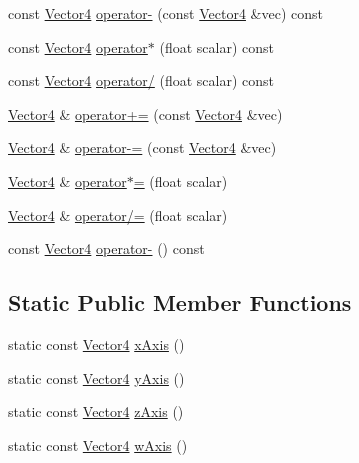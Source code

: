 \begin{DoxyCompactItemize}
\item 
const \hyperlink{classVectormath_1_1Aos_1_1Vector4}{Vector4} \hyperlink{classVectormath_1_1Aos_1_1Vector4_a8018bdd658ac8f5219821ce9fdda49a5}{operator-\/} (const \hyperlink{classVectormath_1_1Aos_1_1Vector4}{Vector4} \&vec) const 
\item 
const \hyperlink{classVectormath_1_1Aos_1_1Vector4}{Vector4} \hyperlink{classVectormath_1_1Aos_1_1Vector4_a1ab5dcfc7471a3a4191ada309e8e6b17}{operator$\ast$} (float scalar) const 
\item 
const \hyperlink{classVectormath_1_1Aos_1_1Vector4}{Vector4} \hyperlink{classVectormath_1_1Aos_1_1Vector4_aa9a6c8290b9d0df86cb084d79bf224bc}{operator/} (float scalar) const 
\item 
\hyperlink{classVectormath_1_1Aos_1_1Vector4}{Vector4} \& \hyperlink{classVectormath_1_1Aos_1_1Vector4_a05e9de303e992db07da0a063c082b6ad}{operator+=} (const \hyperlink{classVectormath_1_1Aos_1_1Vector4}{Vector4} \&vec)
\item 
\hyperlink{classVectormath_1_1Aos_1_1Vector4}{Vector4} \& \hyperlink{classVectormath_1_1Aos_1_1Vector4_a59bf2cc9b51c71553a6c7215f26b1975}{operator-\/=} (const \hyperlink{classVectormath_1_1Aos_1_1Vector4}{Vector4} \&vec)
\item 
\hyperlink{classVectormath_1_1Aos_1_1Vector4}{Vector4} \& \hyperlink{classVectormath_1_1Aos_1_1Vector4_a99749ad29053e85af30ee4842fb4edbc}{operator$\ast$=} (float scalar)
\item 
\hyperlink{classVectormath_1_1Aos_1_1Vector4}{Vector4} \& \hyperlink{classVectormath_1_1Aos_1_1Vector4_ad6d619d2b90f7b6ec3d4efc6cfdb866d}{operator/=} (float scalar)
\item 
const \hyperlink{classVectormath_1_1Aos_1_1Vector4}{Vector4} \hyperlink{classVectormath_1_1Aos_1_1Vector4_ac816661256dbd7777f3e894ac50de9ee}{operator-\/} () const 
\end{DoxyCompactItemize}
\subsection*{Static Public Member Functions}
\begin{DoxyCompactItemize}
\item 
static const \hyperlink{classVectormath_1_1Aos_1_1Vector4}{Vector4} \hyperlink{classVectormath_1_1Aos_1_1Vector4_a2d3d445ccc2312e61f9c580eddb96abe}{x\-Axis} ()
\item 
static const \hyperlink{classVectormath_1_1Aos_1_1Vector4}{Vector4} \hyperlink{classVectormath_1_1Aos_1_1Vector4_abbcd87fdbbebd6d6b8cfb50e0d3a40ba}{y\-Axis} ()
\item 
static const \hyperlink{classVectormath_1_1Aos_1_1Vector4}{Vector4} \hyperlink{classVectormath_1_1Aos_1_1Vector4_a38d4fa96d926c28f7499feef11e546e3}{z\-Axis} ()
\item 
static const \hyperlink{classVectormath_1_1Aos_1_1Vector4}{Vector4} \hyperlink{classVectormath_1_1Aos_1_1Vector4_af323231cf359e29c2bdc95c6f6083c0d}{w\-Axis} ()
\end{DoxyCompactItemize}


